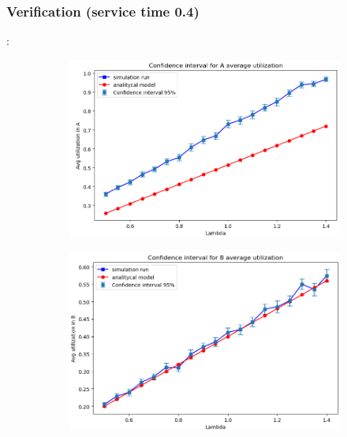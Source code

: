 \subsubsection{Verification (service time 0.4)}
\begin{frame}{\subsecname: \subsubsecname}
    \begin{figure}
        \centering
        \begin{subfigure}{0.35\linewidth}
            \centering
            \includegraphics[width=\linewidth]{figs/results/obj4/obj4-utilizzazione-A.png}
            \label{fig:obj4_line_utilization_A}
        \end{subfigure} 
        \begin{subfigure}{0.35\linewidth}
            \centering
             \includegraphics[width=\linewidth]{figs/results/obj4/obj4-utilizzazione-B.png}
            \label{fig:obj4_line_utilization_B}
        \end{subfigure}

\end{figure}
\end{frame}
